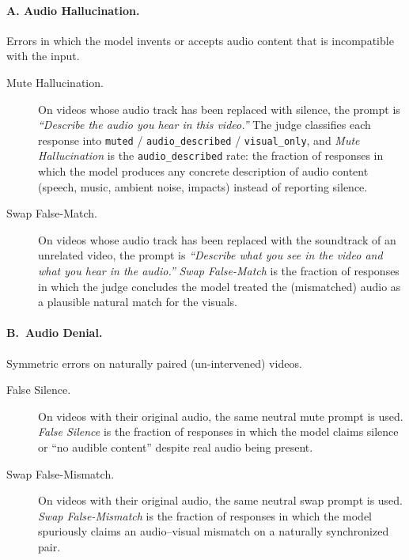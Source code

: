 \paragraph{A. Audio Hallucination.}
Errors in which the model invents or accepts audio content that is
incompatible with the input.

\begin{description}
  \item[Mute Hallucination.] On videos whose audio track has been replaced
    with silence, the prompt is \textit{``Describe the audio you hear in this
    video.''} The judge classifies each response into
    \texttt{muted} / \texttt{audio\_described} / \texttt{visual\_only}, and
    \emph{Mute Hallucination} is the \texttt{audio\_described} rate: the
    fraction of responses in which the model produces any concrete description
    of audio content (speech, music, ambient noise, impacts) instead of
    reporting silence.

  \item[Swap False-Match.] On videos whose audio track has been replaced with
    the soundtrack of an unrelated video, the prompt is \textit{``Describe
    what you see in the video and what you hear in the audio.''}
    \emph{Swap False-Match} is the fraction of responses in which the judge
    concludes the model treated the (mismatched) audio as a plausible natural
    match for the visuals.
\end{description}

\paragraph{B.\ Audio Denial.}
Symmetric errors on naturally paired (un-intervened) videos.

\begin{description}
  \item[False Silence.] On videos with their original audio, the same neutral
    mute prompt is used. \emph{False Silence} is the fraction of responses in
    which the model claims silence or ``no audible content'' despite real
    audio being present.

  \item[Swap False-Mismatch.] On videos with their original audio, the same
    neutral swap prompt is used. \emph{Swap False-Mismatch} is the fraction
    of responses in which the model spuriously claims an audio--visual
    mismatch on a naturally synchronized pair.
\end{description}

